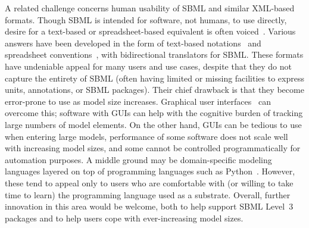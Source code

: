 \documentclass{sbml-paper}
\begin{document}
A related challenge concerns human usability of SBML and similar XML-based formats.  Though SBML is intended for software, not humans, to use directly, desire for a text-based or spreadsheet-based equivalent is often voiced~\citep[e.g.,][]{Kirouac2019reproducibility}.  Various answers have been developed in the form of text-based notations~\citep[e.g.,][]{Gillespie2006tools, Smith2009antimony} and spreadsheet conventions~\citep[e.g.,][]{Lubitz2016sbtab}, with bidirectional translators for SBML.  These formats have undeniable appeal for many users and use cases, despite that they do not capture the entirety of SBML (often having limited or missing facilities to express units, annotations, or SBML packages).  Their chief drawback is that they become error-prone to use as model size increases.  Graphical user interfaces~\citep[GUIs; e.g.,][]{Funahashi2003celldesignera, hoops2006copasi, Moraru2008virtual} can overcome this; software with GUIs can help with the cognitive burden of tracking large numbers of model elements.  On the other hand, GUIs can be tedious to use when entering large models, performance of some software does not scale well with increasing model sizes, and some cannot be controlled programmatically for automation purposes.  A middle ground may be domain-specific modeling languages layered on top of programming languages such as Python~\citep[e.g.,][]{olivier2005modelling, Lopez2013programming}.  However, these tend to appeal only to users who are comfortable with (or willing to take time to learn) the programming language used as a substrate.  Overall, further innovation in this area would be welcome, both to help support SBML Level~3 packages and to help users cope with ever-increasing model sizes.
\end{document}
